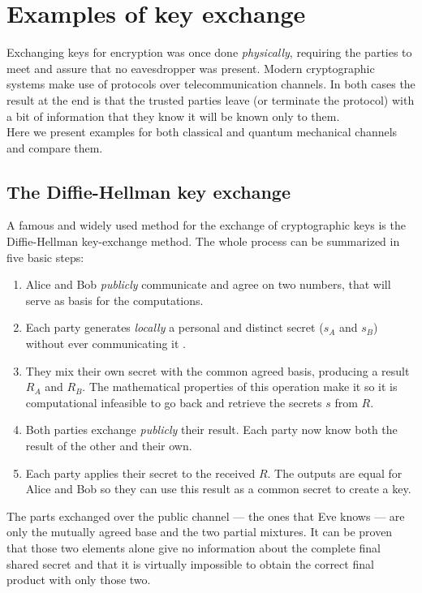 \section{Examples of key exchange}
	Exchanging keys for encryption was once done \textit{physically}, requiring the parties to meet and assure that no eavesdropper was present.
	Modern cryptographic systems make use of protocols over telecommunication channels. 
	In both cases the result at the end is that the trusted parties leave (or terminate the protocol) with a bit of information that they know it will be known only to them.\\
	Here we present examples for both classical and quantum mechanical channels and compare them.
		\subsection{The Diffie-Hellman key exchange}
	
		A famous and widely used method for the exchange of cryptographic keys is the Diffie-Hellman key-exchange method.
	The whole process can be summarized in five basic steps:
	\begin{enumerate}
		\item Alice and Bob \emph{publicly} communicate and agree on two numbers, that will serve as basis for the computations.
		\item Each party generates \emph{locally} a personal and distinct secret ($s_A$ and $s_B$) without ever communicating it .
		\item They mix their own secret with the common agreed basis, producing a result $R_A$ and $R_B$. The mathematical properties of this operation make it so it is computational infeasible to go back and retrieve the secrets $s$ from $R$.
		\item Both parties exchange \emph{publicly} their result. Each party now know both the result of the other and their own.
		\item Each party applies their secret to the received $R$. The outputs are equal for Alice and Bob so they can use this result as a common secret to create a key.
	\end{enumerate}	 
	The parts exchanged over the public channel --- the ones that Eve knows --- are only the mutually agreed base and the two partial mixtures. 
	It can be proven that those two elements alone give no information about the complete final shared secret and that it is virtually impossible to obtain the correct final product with only those two.\\  
	
